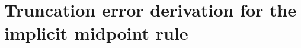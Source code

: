 \chapter{Truncation error derivation for the implicit midpoint rule}
\label{sec:full-imr-lte-calculation}








